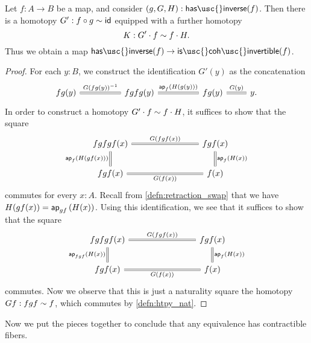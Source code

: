 \begin{lem}\label{lem:coherently-invertible}
  Let $f:A\to B$ be a map, and consider $(g,G,H):\mathsf{has\usc{}inverse}(f)$. Then there is a homotopy $G':f\circ g\sim \mathsf{id}_{}$ equipped with a further homotopy
  \begin{equation*}
    K : G'\cdot f \sim f\cdot H.
  \end{equation*}
  Thus we obtain a map $\mathsf{has\usc{}inverse}(f)\to\mathsf{is\usc{}coh\usc{}invertible}(f)$.
\end{lem}

\begin{proof}
  For each $y:B$, we construct the identification $G'(y)$ as the concatenation
  \begin{equation*}
    \begin{tikzcd}
      fg(y) \arrow[r,equals,"{G(fg(y))}^{-1}"] &[2.5em] fgfg(y) \arrow[r,equals,"\ap{f}{H(g(y))}"] &[2.5em] fg(y) \arrow[r,equals,"G(y)"] & y.
\end{tikzcd}
  \end{equation*}
  In order to construct a homotopy $G'\cdot f\sim f\cdot H$, it suffices to show that the square
  \begin{equation*}
    \begin{tikzcd}[column sep=8em]
      fgfgf(x) \arrow[r,equals,"{G(fgf(x))}"] \arrow[d,equals,swap,"\ap{f}{H(gf(x))}"] & fgf(x) \arrow[d,equals,"\ap{f}{H(x)}"] \\
      fgf(x) \arrow[r,equals,swap,"G(f(x))"] & f(x)
    \end{tikzcd}
  \end{equation*}
  commutes for every $x:A$.
  Recall from \cref{defn:retraction_swap} that we have $H(gf(x))=\mathsf{ap}_{gf}\left({H(x)}\right)$. Using this identification, we see that it suffices to show that the square
  \begin{equation*}
    \begin{tikzcd}[column sep=8em]
      fgfgf(x) \arrow[r,equals,"G(fgf(x))"] \arrow[d,equals,swap,"\ap{fgf}{H(x)}"] & fgf(x) \arrow[d,equals,"\ap{f}{H(x)}"] \\
      fgf(x) \arrow[r,equals,swap,"G(f(x))"] & f(x)
    \end{tikzcd}
  \end{equation*}
  commutes. Now we observe that this is just a naturality square the homotopy $Gf:fgf\sim f$, which commutes by \cref{defn:htpy_nat}.
\end{proof}

Now we put the pieces together to conclude that any equivalence has contractible fibers.

